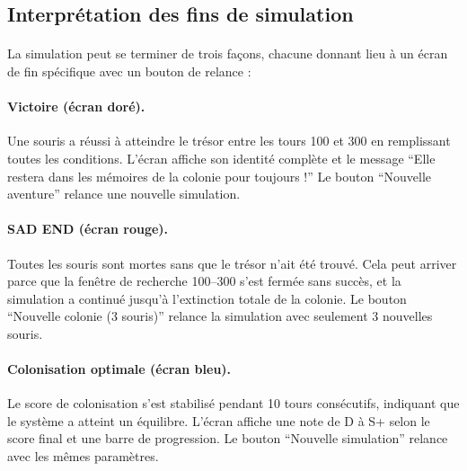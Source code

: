 \bigskip

\subsection{Interprétation des fins de simulation}

\paragraph{} La simulation peut se terminer de trois façons, chacune donnant lieu à un écran de fin spécifique avec un bouton de relance :

\paragraph{Victoire (écran doré).} Une souris a réussi à atteindre le trésor entre les tours 100 et 300 en remplissant toutes les conditions. L'écran affiche son identité complète et le message ``Elle restera dans les mémoires de la colonie pour toujours !'' Le bouton ``Nouvelle aventure'' relance une nouvelle simulation.

\paragraph{SAD END (écran rouge).} Toutes les souris sont mortes sans que le trésor n'ait été trouvé. Cela peut arriver parce que la fenêtre de recherche 100--300 s'est fermée sans succès, et la simulation a continué jusqu'à l'extinction totale de la colonie. Le bouton ``Nouvelle colonie (3 souris)'' relance la simulation avec seulement 3 nouvelles souris.

\paragraph{Colonisation optimale (écran bleu).} Le score de colonisation s'est stabilisé pendant 10 tours consécutifs, indiquant que le système a atteint un équilibre. L'écran affiche une note de D à S+ selon le score final et une barre de progression. Le bouton ``Nouvelle simulation'' relance avec les mêmes paramètres.
